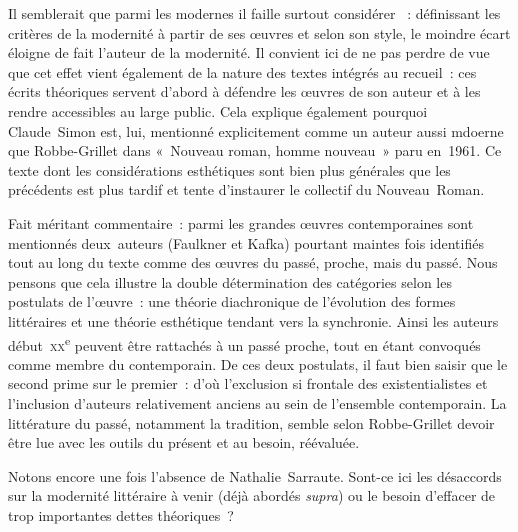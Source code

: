 \documentclass[12pt, a4paper]{article}
\begin{document}
Il semblerait que parmi les modernes il faille surtout considérer \robbe{}~: définissant les critères de la modernité à partir de ses œuvres et selon son style, le moindre écart éloigne de fait l'auteur de la modernité. Il convient ici de ne pas perdre de vue que cet effet vient également de la nature des textes intégrés au recueil~: ces écrits théoriques servent d'abord à défendre les œuvres de son auteur et à les rendre accessibles au large public. Cela explique également pourquoi Claude~Simon est, lui, mentionné explicitement comme un auteur aussi mdoerne que Robbe-Grillet dans «~Nouveau roman, homme nouveau~» paru en~1961. Ce texte dont les considérations esthétiques sont bien plus générales que les précédents est plus tardif et tente d'instaurer le collectif du Nouveau~Roman.




Fait méritant commentaire~: parmi les grandes œuvres contemporaines sont mentionnés deux~auteurs (Faulkner et Kafka) pourtant maintes fois identifiés tout au long du texte comme des œuvres du passé, proche, mais du passé. Nous pensons que cela illustre la double détermination des catégories selon les postulats de l'œuvre~: une théorie diachronique de l'évolution des formes littéraires et une théorie esthétique tendant vers la synchronie. Ainsi les auteurs début~\textsc{xx}\textsuperscript{e} peuvent être rattachés à un passé proche, tout en étant convoqués comme membre du contemporain. De ces deux postulats, il faut bien saisir que le second prime sur le premier~: d'où l'exclusion si frontale des existentialistes et l'inclusion d'auteurs relativement anciens au sein de l'ensemble contemporain. La littérature du passé, notamment la tradition, semble selon Robbe-Grillet devoir être lue avec les outils du présent et au besoin, réévaluée.







Notons encore une fois l'absence de Nathalie~Sarraute. Sont-ce ici les désaccords sur la modernité littéraire à venir (déjà abordés \textit{supra}) ou le besoin d'effacer de trop importantes dettes théoriques~?
\end{document}
